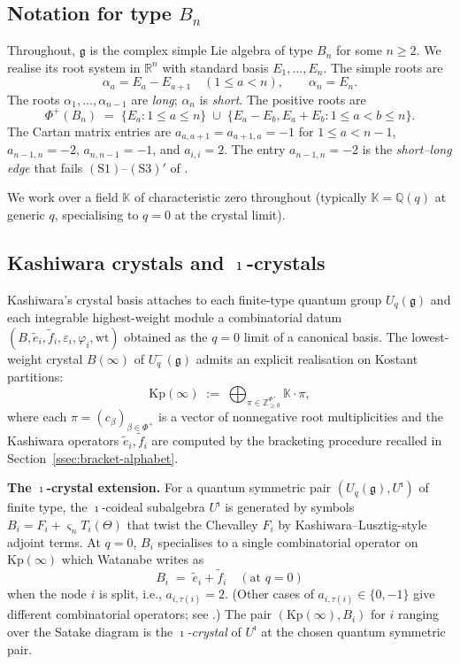 \documentclass[11pt]{article}
\theoremstyle{definition}
\theoremstyle{remark}
\newcommand{\Kp}{\mathrm{Kp}}
\newcommand{\KK}{\mathbb{K}}
\newcommand{\Z}{\mathbb{Z}}
\newcommand{\Zn}{\Z_{\geq 0}}
\newcommand{\g}{\mathfrak{g}}
\newcommand{\Uq}{U_q(\g)}
\newcommand{\Uqm}{U_q^-(\g)}
\newcommand{\Uiota}{U^\imath}
\begin{document}
\subsection{Notation for type $B_n$}\label{ssec:notation-Bn}

Throughout, $\g$ is the complex simple Lie algebra of type $B_n$ for some $n \geq 2$. We
realise its root system in $\mathbb{R}^n$ with standard basis $E_1, \ldots, E_n$. The simple
roots are
\[
\alpha_a = E_a - E_{a+1} \quad (1 \leq a < n), \qquad \alpha_n = E_n.
\]
The roots $\alpha_1, \ldots, \alpha_{n-1}$ are \emph{long}; $\alpha_n$ is \emph{short}. The
positive roots are
\[
\Phi^+(B_n) \;=\; \{E_a : 1 \leq a \leq n\} \;\cup\; \{E_a - E_b, E_a + E_b : 1 \leq a < b \leq n\}.
\]
The Cartan matrix entries are $a_{a,a+1} = a_{a+1,a} = -1$ for $1 \leq a < n-1$, $a_{n-1,n} =
-2$, $a_{n,n-1} = -1$, and $a_{i,i} = 2$. The entry $a_{n-1,n} = -2$ is the \emph{short--long
edge} that fails $(\mathrm{S1})$--$(\mathrm{S3})'$ of \cite{Watanabe2110}.

We work over a field $\KK$ of characteristic zero throughout (typically $\KK = \mathbb{Q}(q)$
at generic $q$, specialising to $q = 0$ at the crystal limit).

\subsection{Kashiwara crystals and $\imath$-crystals}\label{ssec:kashiwara}

Kashiwara's crystal basis \cite{Kashiwara1991} attaches to each finite-type quantum group
$\Uq$ and each integrable highest-weight module a combinatorial datum $(B, \tilde e_i,
\tilde f_i, \varepsilon_i, \varphi_i, \mathrm{wt})$ obtained as the $q = 0$ limit of a
canonical basis. The lowest-weight crystal $B(\infty)$ of $\Uqm$ admits an explicit realisation
on Kostant partitions:
\[
\Kp(\infty) \;:=\; \bigoplus_{\pi \in \Zn^{\Phi^+}} \KK \cdot \pi,
\]
where each $\pi = (c_\beta)_{\beta \in \Phi^+}$ is a vector of nonnegative root multiplicities
and the Kashiwara operators $\tilde e_i, \tilde f_i$ are computed by the bracketing procedure
recalled in Section~\ref{ssec:bracket-alphabet}.

\medskip
\noindent\textbf{The $\imath$-crystal extension.}
For a quantum symmetric pair $(\Uq, \Uiota)$ of finite type, the $\imath$-coideal subalgebra
$\Uiota$ is generated by symbols $B_i = F_i + \varsigma_n T_i(\Theta)$ that twist the Chevalley
$F_i$ by Kashiwara--Lusztig-style adjoint terms. At $q = 0$, $B_i$ specialises to a
single combinatorial operator on $\Kp(\infty)$ which Watanabe \cite{Watanabe2107} writes as
\[
B_i \;=\; \tilde e_i + \tilde f_i \quad (\text{at } q = 0)
\]
when the node $i$ is split, i.e., $a_{i,\tau(i)} = 2$. (Other cases of $a_{i,\tau(i)} \in
\{0, -1\}$ give different combinatorial operators; see \cite[\S4.1]{Watanabe2110}.) The pair
$(\Kp(\infty), B_i)$ for $i$ ranging over the Satake diagram is the \emph{$\imath$-crystal}
of $\Uiota$ at the chosen quantum symmetric pair.
\end{document}
